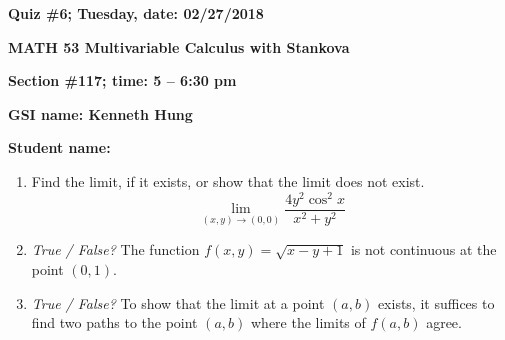\documentclass{article}
\begin{document}
{\bf Quiz \#6; Tuesday, date: 02/27/2018}

{\bf MATH 53 Multivariable Calculus with Stankova}

{\bf Section \#117; time: 5 -- 6:30 pm}

{\bf GSI name: Kenneth Hung}

{\bf Student name:}

\vspace*{0.25in}

\begin{enumerate}
\item Find the limit, if it exists, or show that the limit does not exist.
\[
\lim_{(x, y) \to (0, 0)} \frac{4y^2 \cos^2 x}{x^2 + y^2}
\]

\item {\em True / False?} The function $f(x, y) = \sqrt{x - y + 1}$ is not continuous at the point $(0, 1)$.

\item {\em True / False?} To show that the limit at a point $(a, b)$ exists, it suffices to find two paths to the point $(a, b)$ where the limits of $f(a, b)$ agree.
\end{enumerate}
\end{document}
